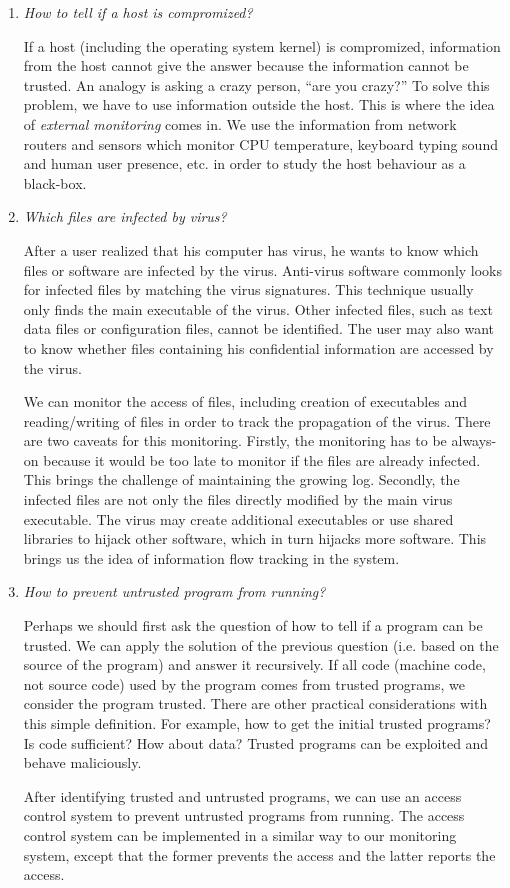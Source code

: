 \begin{enumerate}
\item {\em How to tell if a host is compromized?}

If a host (including the operating system kernel) is compromized,
information from the host cannot give the answer because
the information cannot be trusted.
An analogy is asking a crazy person, ``are you crazy?''
To solve this problem, we have to use information outside the
host.
This is where the idea of {\em external monitoring} comes in.
We use the information from network routers and
sensors which monitor CPU temperature, keyboard typing sound
and human user presence, etc. in order to study the host behaviour
as a black-box.

\item {\em Which files are infected by virus?}

After a user realized that his computer has virus, he wants to know
which files or software are infected by the virus.
Anti-virus software commonly looks for infected files by matching the
virus signatures.
This technique usually only finds the main executable of the virus.
Other infected files, such as text data files or configuration files,
cannot be identified.
The user may also want to know whether files containing his confidential
information are accessed by the virus.

We can monitor the access of files, including creation of executables
and reading/writing of files in order to track the propagation of the virus.
There are two caveats for this monitoring.
Firstly, the monitoring has to be always-on because it would be
too late to monitor if the files are already infected.
This brings the challenge of maintaining the growing log.
Secondly, the infected files are not only the files directly modified by
the main virus executable.
The virus may create additional executables or use shared libraries to
hijack other software, which in turn hijacks more software.
This brings us the idea of information flow tracking in the system.

\item {\em How to prevent untrusted program from running?}

Perhaps we should first ask the question of how to tell if
a program can be trusted.
We can apply the solution of the previous question (i.e.
based on the source of the program) and answer it recursively.
If all code (machine code, not source code)
used by the program comes from trusted programs,
we consider the program trusted.
There are other practical considerations with this simple definition.
For example, how to get the initial trusted programs?
Is code sufficient? How about data?
Trusted programs can be exploited and behave maliciously.

After identifying trusted and untrusted programs,
we can use an access control system to prevent
untrusted programs from running.
The access control system can be implemented in a similar way to our
monitoring system, except that the former prevents the
access and the latter reports the access.
\end{enumerate}

